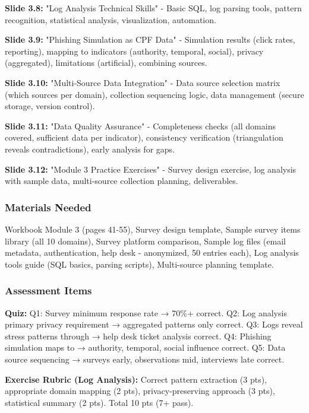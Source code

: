 \documentclass[11pt,a4paper]{article}
\begin{document}
\textbf{Slide 3.8:} "Log Analysis Technical Skills" - Basic SQL, log parsing tools, pattern recognition, statistical analysis, visualization, automation.

\textbf{Slide 3.9:} "Phishing Simulation as CPF Data" - Simulation results (click rates, reporting), mapping to indicators (authority, temporal, social), privacy (aggregated), limitations (artificial), combining sources.

\textbf{Slide 3.10:} "Multi-Source Data Integration" - Data source selection matrix (which sources per domain), collection sequencing logic, data management (secure storage, version control).

\textbf{Slide 3.11:} "Data Quality Assurance" - Completeness checks (all domains covered, sufficient data per indicator), consistency verification (triangulation reveals contradictions), early analysis for gaps.

\textbf{Slide 3.12:} "Module 3 Practice Exercises" - Survey design exercise, log analysis with sample data, multi-source collection planning, deliverables.

\subsubsection{Materials Needed}

Workbook Module 3 (pages 41-55), Survey design template, Sample survey items library (all 10 domains), Survey platform comparison, Sample log files (email metadata, authentication, help desk - anonymized, 50 entries each), Log analysis tools guide (SQL basics, parsing scripts), Multi-source planning template.

\subsubsection{Assessment Items}

\textbf{Quiz:} Q1: Survey minimum response rate → 70\%+ correct. Q2: Log analysis primary privacy requirement → aggregated patterns only correct. Q3: Logs reveal stress patterns through → help desk ticket analysis correct. Q4: Phishing simulation maps to → authority, temporal, social influence correct. Q5: Data source sequencing → surveys early, observations mid, interviews late correct.

\textbf{Exercise Rubric (Log Analysis):} Correct pattern extraction (3 pts), appropriate domain mapping (2 pts), privacy-preserving approach (3 pts), statistical summary (2 pts). Total 10 pts (7+ pass).
\end{document}
